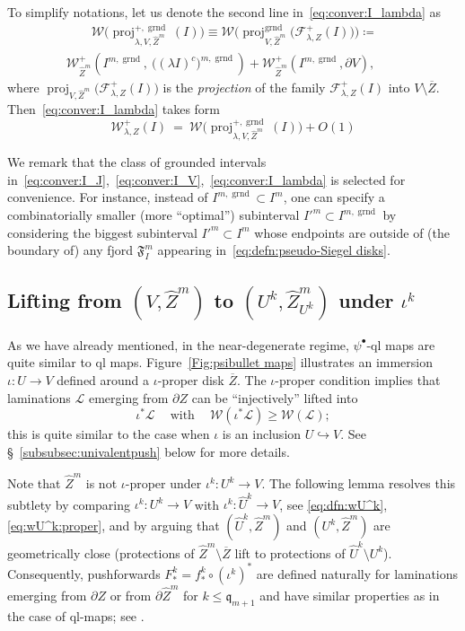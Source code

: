 \documentclass{amsart}
\newcommand{\proj}{{\operatorname{proj}}}
\renewcommand{\sp}{{\ \ }}
\newcommand{\1}{{\mathbb 1 }}
\newcommand{\Fam}{{\mathcal F}}
\newcommand{\Width}{{\mathcal W}}
\newcommand\LL{{\mathcal L}}
\newcommand{\wZ}{{\widehat Z}}
\newcommand{\qq}{\mathfrak{q}}
\newcommand{\grnd}{{\operatorname{grnd}}}
\theoremstyle{remark}
\numberwithin{equation}{section}
\theoremstyle{definition}
\newcommand{\Fjord}{{\mathfrak F}}
\begin{document}
To simplify notations, let us denote the second line in~\eqref{eq:conver:I_lambda} as
\begin{multline} \label{eq:dfn:proj:Fam}   \qquad \Width\big(\proj^{+,\grnd}_{\lambda,V, \wZ^m}(I) \big) \equiv  \Width\Big(\proj^\grnd_{V,\wZ^m} \big(\Fam^+_{\lambda, Z}(I)\big) \Big) \coloneqq \\\Width^+_{\wZ^m}\left(I^{m,\grnd},\ \Big((\lambda I)^c\Big)^{m,\grnd}\right)+\Width^+_{\wZ^m}(I^{m,\grnd},\partial V),\qquad
\end{multline}
where $\proj_{V,\wZ^m} \big(\Fam^+_{\lambda, Z}(I)\big)$ is the \emph{projection} of the family $\Fam^+_{\lambda, Z}(I)$ into $V\setminus \overline Z$. Then~\eqref{eq:conver:I_lambda} takes form
\begin{equation}
    \label{eq:conver:I_lambda:2}\Width^+_{\lambda, Z}(I) \ =\ \Width\big(\proj^{+,\grnd}_{\lambda, V, \wZ^m}(I) \big) +O(1)
\end{equation}

We remark that the class of grounded intervals in~\eqref{eq:conver:I_J},~\eqref{eq:conver:I_V},~\eqref{eq:conver:I_lambda} is selected for convenience. For instance, instead of $I^{m,\grnd}\subset I^m$, one can specify a combinatorially smaller (more ``optimal'') subinterval $I'^m\subset I^{m,\grnd}$ by considering the biggest subinterval $I'^m\subset I^m$ whose endpoints are outside of (the boundary of) any fjord $\Fjord^m_I$ appearing in~\eqref{eq:defn:pseudo-Siegel disks}. 


\subsection{Lifting from $(V,\widehat Z^m)$ to $(U^k,\widehat Z^m_{U^k})$ under $\iota^k$}\label{ss: propertyimmersion}
As we have already mentioned, in the near-degenerate regime, $\psi^\bullet$-ql maps are quite similar to ql maps.  Figure~\ref{Fig:psibullet maps} illustrates an immersion $\iota\colon U\to V$ defined around a $\iota$-proper disk  $\overline Z$. The $\iota$-proper condition implies that laminations $\LL$ emerging from $\partial Z$ can be ``injectively'' lifted  into 
\[\iota^*\LL\sp\sp \text{ with }\sp\sp \Width(\iota^*\LL)\ge \Width(\LL);\]
this is quite similar to the case when $\iota$ is an inclusion $U\hookrightarrow V$. See \S~\ref{subsubsec:univalentpush} below for more details.


Note that $\wZ^m$ is not $\iota$-proper under $\iota^k\colon U^k\to V$. The following lemma resolves this subtlety by comparing   $\iota^k\colon U^k\to V$ with $\iota^k\colon \widehat U^k\to V$, see \eqref{eq:dfn:wU^k}, \eqref{eq:wU^k:proper}, and by arguing that $(\widehat U^k, \wZ^m)$ and $(U^k, \wZ^m)$ are geometrically close (protections of $\wZ^m\setminus \overline Z$ lift to protections of $\widehat U^k\setminus U^k$). Consequently, pushforwards $F^k_*=f^k_*\circ (\iota^k)^*$ are defined naturally for laminations emerging from $\partial Z$ or from $\partial \wZ^m$ for $k\le \qq_{m+1}$ and have similar properties as in the case of ql-maps; see \cite{K,KL2,molecules,DL:Feigen}.
\end{document}
